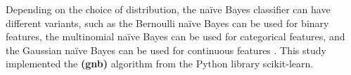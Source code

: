 




Depending on the choice of distribution, the naïve Bayes classifier can have different variants, such as the Bernoulli naïve Bayes can be used for binary features, the multinomial naïve Bayes can be used for categorical features, and the Gaussian naïve Bayes can be used for continuous features \cite{Friedman1997}. This study implemented the \textbf{ (\gls{gnb})} algorithm from the Python library scikit-learn.%


